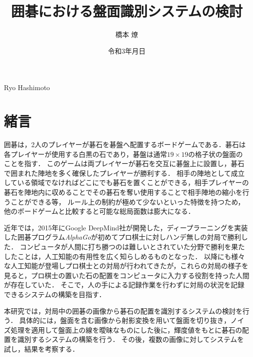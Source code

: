\documentclass[summary]{nitocs}
\numberwithin{equation}{section}
\begin{document}
    \title{囲碁における盤面識別システムの検討}
    \author{橋本 燎}{Ryo Hashimoto} %

    \date{令和3年\number\month 月\number\day 日} 

    \maketitle
    \section{緒言} \label{intro}
        囲碁は，2人のプレイヤーが碁石を碁盤へ配置するボードゲームである．碁石は各プレイヤーが使用する白黒の石であり，碁盤は通常$19\times19$の格子状の盤面のことを指す．
        このゲームは両プレイヤーが碁石を交互に碁盤上に設置し，碁石で囲まれた陣地を多く確保したプレイヤーが勝利する．
        相手の陣地として成立している領域でなければどこにでも碁石を置くことができる，相手プレイヤーの碁石を陣地内に収めることでその碁石を奪い使用することで相手陣地の縮小を行うことができる等，
        ルール上の制約が極めて少ないといった特徴を持つため，他のボードゲームと比較すると可能な総局面数は膨大になる．
        
        近年では，2015年にGoogle DeepMind社が開発した，ディープラーニングを実装した囲碁プログラム{\it AlphaGo}\cite{AlphaGo}が初めてプロ棋士に対しハンデ無しの対局で勝利した．
        コンピュータが人間に打ち勝つのは難しいとされていた分野で勝利を果たしたことは，人工知能の有用性を広く知らしめるものとなった．
        以降にも様々な人工知能が登場しプロ棋士との対局が行われてきたが，これらの対局の様子を見ると，プロ棋士の置いた石の配置をコンピュータに入力する役割を持った人間が存在していた．
        そこで，人の手による記録作業を行わずに対局の状況を記録できるシステムの構築を目指す．

        本研究では，対局中の囲碁の画像から碁石の配置を識別するシステムの検討を行う．
        具体的には，盤面を含む画像から射影変換を用いて盤面を切り抜き，ノイズ処理を適用して盤面上の線を曖昧なものにした後に，輝度値をもとに碁石の配置を識別するシステムの構築を行う．
        その後，複数の画像に対してシステムを試し，結果を考察する．
\end{document}
